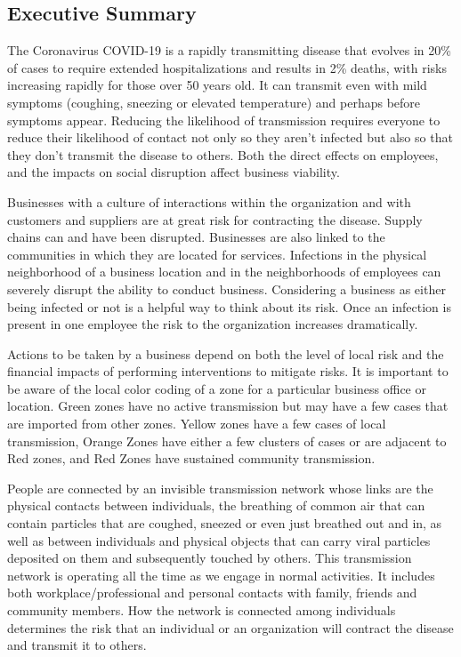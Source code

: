 \documentclass[onecolumn,journal]{IEEEtran}
\begin{document}
\begin{multicols}{2}

\section*{Executive Summary}

The Coronavirus COVID-19 is a rapidly transmitting disease that evolves in 20\% of cases to require extended hospitalizations and results in 2\% deaths, with risks increasing rapidly for those over 50 years old. It can transmit even with mild symptoms (coughing, sneezing or elevated temperature) and perhaps before symptoms appear. Reducing the likelihood of transmission requires everyone to reduce their likelihood of contact not only so they aren't infected but also so that they don't transmit the disease to others. Both the direct effects on employees, and the impacts on social disruption affect business viability.

Businesses with a culture of interactions within the organization and with customers and suppliers are at great risk for contracting the disease. Supply chains can and have been disrupted. Businesses are also linked to the communities in which they are located for services. Infections in the physical neighborhood of a business location and in the neighborhoods of employees can severely disrupt the ability to conduct business. Considering a business as either being infected or not is a helpful way to think about its risk. Once an infection is present in one employee the risk to the organization increases dramatically.

Actions to be taken by a business depend on both the level of local risk and the financial impacts of performing interventions to mitigate risks. It is important to be aware of the local color coding of a zone for a particular business office or location. Green zones have no active transmission but may have a few cases that are imported from other zones. Yellow zones have a few cases of local transmission, Orange Zones have either a few clusters of cases or are adjacent to Red zones, and Red Zones have sustained community transmission.

People are connected by an invisible transmission network whose links are the physical contacts between individuals, the breathing of common air that can contain particles that are coughed, sneezed or even just breathed out and in, as well as between individuals and physical objects that can carry viral particles deposited on them and subsequently touched by others. This transmission network is operating all the time as we engage in normal activities. It includes both workplace/professional and personal contacts with family, friends and community members. How the network is connected among individuals determines the risk that an individual or an organization will contract the disease and transmit it to others.


\end{multicols}
\end{document}
